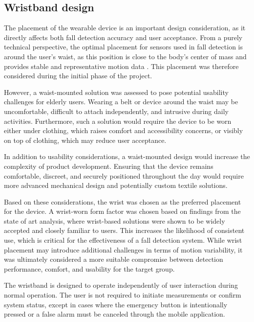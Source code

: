 \subsection{Wristband design}
The placement of the wearable device is an important design consideration, as it directly affects both fall detection accuracy and user acceptance. From a purely technical perspective, the optimal placement for sensors used in fall detection is around the user’s waist, as this position is close to the body’s center of mass and provides stable and representative motion data \cite{Garcia2022_Neurocomputing}. This placement was therefore considered during the initial phase of the project.

However, a waist-mounted solution was assessed to pose potential usability challenges for elderly users. Wearing a belt or device around the waist may be uncomfortable, difficult to attach independently, and intrusive during daily activities. Furthermore, such a solution would require the device to be worn either under clothing, which raises comfort and accessibility concerns, or visibly on top of clothing, which may reduce user acceptance.

In addition to usability considerations, a waist-mounted design would increase the complexity of product development. Ensuring that the device remains comfortable, discreet, and securely positioned throughout the day would require more advanced mechanical design and potentially custom textile solutions.

Based on these considerations, the wrist was chosen as the preferred placement for the device. A wrist-worn form factor was chosen based on findings from the state of art analysis, where wrist-based solutions were shown to be widely accepted and closely familiar to users. This increases the likelihood of consistent use, which is critical for the effectiveness of a fall detection system. While wrist placement may introduce additional challenges in terms of motion variability, it was ultimately considered a more suitable compromise between detection performance, comfort, and usability for the target group.

The wristband is designed to operate independently of user interaction during normal operation. The user is not required to initiate measurements or confirm system status, except in cases where the emergency button is intentionally pressed or a false alarm must be canceled through the mobile application.
